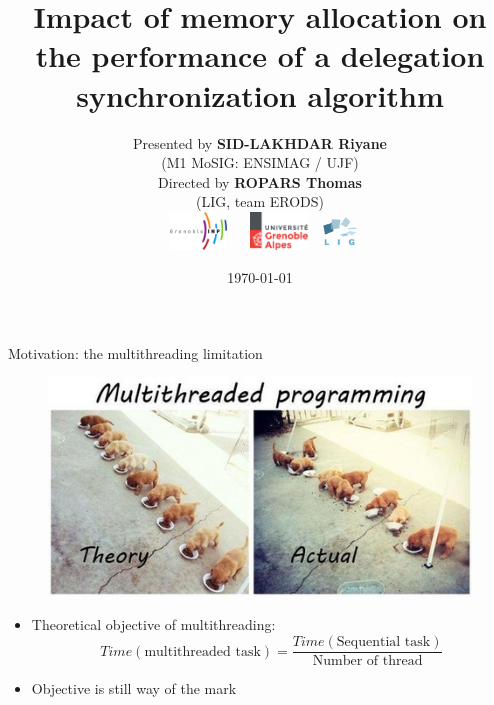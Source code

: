 \documentclass[xcolor=x11names,compress]{beamer}
\renewcommand{\(}{\begin{columns}}
\renewcommand{\)}{\end{columns}}
\newcommand{\<}[1]{\begin{column}{#1}}
\renewcommand{\>}{\end{column}}
\begin{document}

\begin{frame}
\title{Impact of memory allocation on the performance of a delegation synchronization algorithm}
\author
{
	Presented by \textbf{SID-LAKHDAR Riyane}\\
    (M1 MoSIG: ENSIMAG / UJF)\\
	Directed by \textbf{ROPARS Thomas}\\
    (LIG, team ERODS)\\
	\includegraphics[height=1cm,width=2cm]{logo/logoINP.png}
	\includegraphics[height=1cm,width=2cm]{logo/logoUJF.jpg}
	\includegraphics[height=1cm,width=1cm]{logo/logoLIG.jpg}
}
\date
{
	\vspace{1cm}
	\today
}
\titlepage
\end{frame}



\begin{frame}{Motivation: the multithreading limitation}
	\begin{figure}
		\includegraphics[width=0.7\linewidth]{charts/multithreading_theory_reality.jpeg}
	\end{figure}

	\begin{itemize}
		\item Theoretical objective of multithreading:
			\begin{equation*}
				Time(\mbox{multithreaded task}) = \frac{Time(\mbox{Sequential task})}{\mbox{Number of thread}}
			\end{equation*}

		\item Objective is still way of the mark
	\end{itemize}
\end{frame}
\end{document}
